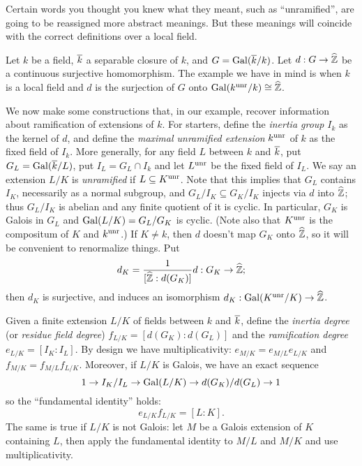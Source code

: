  Certain words you thought you knew what they meant, such as
``unramified'', are going to be reassigned more abstract meanings. But
these meanings will coincide with the correct definitions over a local field.


Let $k$ be a field, $\overline{k}$ a separable closure of $k$, and
$G = \operatorname{Gal}(\overline{k}/k)$. Let $d: G \to \widehat{\mathbb{Z}}$ be a continuous
surjective homomorphism. The example we have in mind is when
$k$ is a local field
and $d$ is the surjection of $G$ onto
$\operatorname{Gal}(k^{\operatorname{unr}}/k) \cong \widehat{\mathbb{Z}}$.

We now make some constructions that, in our example, recover information
about ramification of extensions of $k$. For starters, define the
\emph{inertia group} $I_k$ as the kernel of $d$, and define
the \emph{maximal unramified extension} $k^{\operatorname{unr}}$ of $k$ as the fixed
field of $I_k$. More generally, for any field $L$ between $k$ and $\overline{k}$,
put $G_L = \operatorname{Gal}(\overline{k}/L)$,
put $I_L = G_L \cap I_k$ and let $L^{\operatorname{unr}}$ be the fixed field of $I_L$.
We say an extension $L/K$ is \emph{unramified} if $L \subseteq K^{\operatorname{unr}}$.
Note that this implies that $G_L$ contains $I_K$, necessarily as a normal
subgroup, and $G_L/I_K \subseteq G_K/I_K$ injects via $d$ into
$\widehat{\mathbb{Z}}$; thus $G_L/I_K$ is abelian and any finite quotient of it
is cyclic. In particular, $G_K$ is Galois in $G_L$ and $\operatorname{Gal}(L/K) =
G_L/G_K$ is cyclic. (Note also that $K^{\operatorname{unr}}$ is the compositum of
$K$ and $k^{\operatorname{unr}}$.) 
If $K \neq k$, then $d$ doesn't map $G_K$ onto $\widehat{\mathbb{Z}}$, so it
will be convenient to renormalize things. Put
\[
d_K = \frac{1}{[\widehat{\mathbb{Z}}: d(G_K)]}d: G_K \to \widehat{\mathbb{Z}};
\]
then $d_K$ is surjective, and induces an isomorphism $d_K: \operatorname{Gal}(K^{\operatorname{unr}}/K)
\to \widehat{\mathbb{Z}}$.

Given a finite extension $L/K$ of fields between $k$ and $\overline{k}$,
define the \emph{inertia degree} (or \emph{residue field degree})
$f_{L/K} = [d(G_K):d(G_L)]$
and the \emph{ramification degree} $e_{L/K} = [I_K:I_L]$. By design
we have multiplicativity: $e_{M/K} = e_{M/L}e_{L/K}$ and
$f_{M/K} = f_{M/L}f_{L/K}$. Moreover, if $L/K$ is Galois, we have
an exact sequence
\[
1 \to I_K/I_L \to \operatorname{Gal}(L/K) \to d(G_K)/d(G_L) \to 1
\]
so the ``fundamental identity'' holds:
\[
e_{L/K}f_{L/K} = [L:K].
\]
The same is true if $L/K$ is not Galois: let $M$ be a Galois extension
of $K$ containing $L$, then apply the fundamental identity to $M/L$
and $M/K$ and use multiplicativity.


